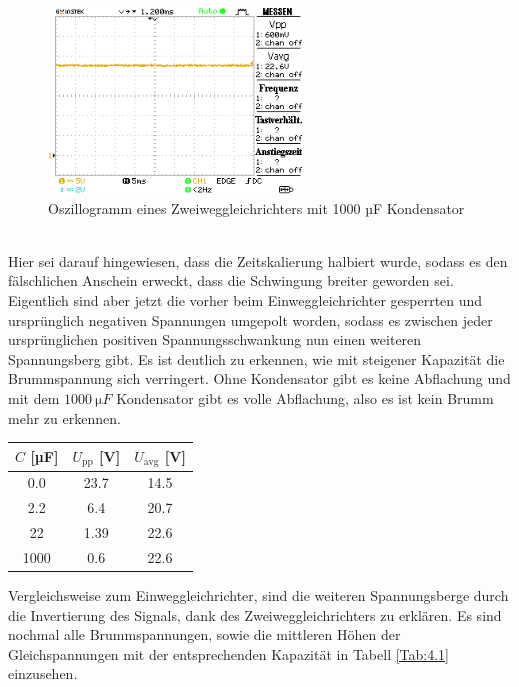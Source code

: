 \documentclass[a4paper,10pt]{article}
\numberwithin{equation}{section}
\begin{document}
\begin{figure}[h]
	\centering
	\includegraphics[width=0.6\textwidth]{data/a4_d.BMP.png}
	\caption{Oszillogramm eines Zweiweggleichrichters mit 1000 µF Kondensator}
	\label{fig:4.4}
\end{figure}\\
Hier sei darauf hingewiesen, dass die Zeitskalierung halbiert wurde, sodass es den fälschlichen Anschein erweckt, dass die Schwingung breiter geworden sei. Eigentlich sind aber jetzt die vorher beim Einweggleichrichter gesperrten und ursprünglich negativen Spannungen umgepolt worden, sodass es zwischen jeder ursprünglichen positiven Spannungsschwankung nun einen weiteren Spannungsberg gibt.
Es ist deutlich zu erkennen, wie mit steigener Kapazität die Brummspannung sich verringert. Ohne Kondensator gibt es keine Abflachung und mit dem $\SI{1000}{\micro F}$ Kondensator gibt es volle Abflachung, also es ist kein Brumm mehr zu erkennen.
\begin{center}
	\begin{tabular}{|c|c|c|}
		\hline
    \(C \) [µF] & \(U_{\text{pp}}\) [V] & \(U_{\text{avg}}\) [V]\\
		\hline
    0.0 & 23.7 & 14.5\\
    2.2 & 6.4 & 20.7 \\
    22 & 1.39 & 22.6 \\
    1000 & 0.6 & 22.6 \\
		\hline
	\end{tabular}
	\label{Tab:4.1}
\end{center}
Vergleichsweise zum Einweggleichrichter, sind die weiteren Spannungsberge durch die Invertierung des Signals, dank des Zweiweggleichrichters zu erklären. Es sind nochmal alle Brummspannungen, sowie die mittleren Höhen der Gleichspannungen mit der entsprechenden Kapazität in Tabell \ref{Tab:4.1} einzusehen.
\clearpage
\end{document}
